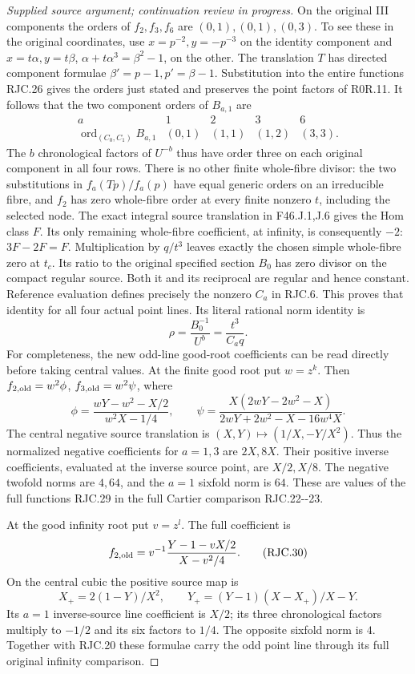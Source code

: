 \begin{proof}[Supplied source argument; continuation review in progress]
On the original III components the orders of \(f_2,f_3,f_6\) are
\((0,1),(0,1),(0,3)\). To see these in the original coordinates,
use \(x=p^{-2},y=-p^{-3}\) on the identity component and
\(x=t\alpha,y=t\beta\),
\(\alpha+t\alpha^3=\beta^2-1\), on the other.
The translation \(T\) has directed component formulae
\(\beta'=p-1,p'=\beta-1\).
Substitution into the entire functions RJC.26 gives the orders
just stated and preserves the point factors of R0R.11.
It follows that the two component orders of \(B_{a,1}\) are
\[
 \begin{array}{c|cccc}
 a&1&2&3&6\\ \hline
 \operatorname{ord}_{(C_0,C_1)}B_{a,1}
 &(0,1)&(1,1)&(1,2)&(3,3).
 \end{array}
 \tag{RJC.28}
\]
The \(b\) chronological factors of \(U^{-b}\) thus have order
three on each original component in all four rows. There is no
other finite whole-fibre divisor: the two substitutions in
\(f_a(Tp)/f_a(p)\) have equal generic orders on an irreducible
fibre, and \(f_2\) has zero whole-fibre order at every finite
nonzero \(t\), including the selected node.
The exact integral source translation in F46.J.1,J.6 gives the
Hom class \(F\). Its only remaining whole-fibre coefficient, at
infinity, is consequently \(-2\): \(3F-2F=F\).
Multiplication by \(q/t^3\) leaves exactly the chosen simple
whole-fibre zero at \(t_c\). Its ratio to the original specified
section \(B_0\) has zero divisor on the compact regular source.
Both it and its reciprocal are regular and hence constant.
Reference evaluation defines precisely the nonzero \(C_a\) in
RJC.6. This proves that identity for all four actual point lines.
Its literal rational norm identity is
\[
 \rho=\frac{B_0^{-1}}{U^b}=\frac{t^3}{C_aq}.                         \tag{RJC.7}
\]
For completeness, the new odd-line good-root coefficients can be
read directly before taking central values. At the finite good root
put \(w=z^k\). Then \(f_{2,\rm old}=w^2\phi\),
\(f_{3,\rm old}=w^2\psi\), where
\[
 \phi=\frac{wY-w^2-X/2}{w^2X-1/4},\qquad
 \psi=\frac{X(2wY-2w^2-X)}
 {2wY+2w^2-X-16w^4X}.
 \tag{RJC.29}
\]
The central negative source translation is
\((X,Y)\mapsto(1/X,-Y/X^2)\).
Thus the normalized negative coefficients for \(a=1,3\) are
\(2X,8X\). Their positive inverse coefficients, evaluated at the
inverse source point, are \(X/2,X/8\). The negative twofold
norms are \(4,64\), and the \(a=1\) sixfold norm is \(64\).
These are values of the full functions RJC.29 in the full
Cartier comparison RJC.22-\/-23.

At the good infinity root put \(v=z^l\). The full coefficient is
\[
 f_{2,\rm old}=v^{-1}
 \frac{Y-1-vX/2}{X-v^2/4}.
 \tag{RJC.30}
\]
On the central cubic the positive source map is
\[
 X_+=2(1-Y)/X^2,\qquad
 Y_+=(Y-1)(X-X_+)/X-Y.
 \tag{RJC.31}
\]
Its \(a=1\) inverse-source line coefficient is \(X/2\);
its three chronological factors multiply to \(-1/2\) and
its six factors to \(1/4\). The opposite sixfold norm is \(4\).
Together with RJC.20 these formulae carry the odd point line
through its full original infinity comparison.


\end{proof}
